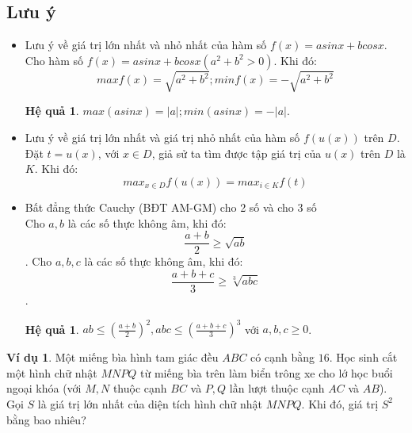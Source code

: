 \documentclass[12pt,a4paper,oneside]{book}
\theoremstyle{theorem}
\theoremstyle{definition}
\newtheorem{vd}[theorem2]{Ví dụ}
\newtheorem{hq}[theorem2]{Hệ quả}
\begin{document}
    \subsection{Lưu ý}
        \begin{itemize}
            \item[(i)] Lưu ý về giá trị lớn nhất và nhỏ nhất của hàm số $f(x)=asinx+bcosx$.\\
            Cho hàm số $f(x)=asinx+bcosx(a^2+b^2>0)$. Khi đó:
            $$maxf(x)= \sqrt{a^2+b^2};min f(x)=-\sqrt{a^2+b^2}$$
            \begin{hq}
                $max(asinx)= \lvert a \rvert; min(asinx)=-\lvert a \rvert$.
            \end{hq}
            \item[(ii)] Lưu ý về giá trị lớn nhất và giá trị nhỏ nhất của hàm số $f(u(x))$ trên $D$.\\
            Đặt $t=u(x)$, với $x \in D$, giả sử ta tìm được tập giá trị của $u(x)$ trên $D$ là $K$. Khi đó:
            $$max_{x\in D} f(u(x))= max_{i \in K} f(t)$$
            \item[(iii)] Bất đẳng thức Cauchy (BĐT AM-GM) cho 2 số và cho 3 số\\
            Cho $a,b$ là các số thực không âm, khi đó:
            $$\frac{a+b}{2} \geq \sqrt{ab}$$.
            Cho $a,b,c$ là các số thực không âm, khi đó:
            $$\frac{a+b+c}{3} \geq \sqrt[3]{abc}$$.
            \begin{hq}
                $ab \leq (\frac{a+b}{2})^2,abc \leq (\frac{a+b+c}{3})^3$ với $a,b,c \geq0$.
            \end{hq}
        \end{itemize}
        \begin{minipage}{0.68\textwidth}
        \begin{vd}
            Một miếng bìa hình tam giác đều $ABC$ có cạnh bằng $16$. Học sinh cắt một hình chữ nhật $MNPQ$ từ miếng bìa trên làm biển trông xe cho lớ học buổi ngoại khóa (với $M,N$ thuộc cạnh $BC$ và $P,Q$ lần lượt thuộc cạnh $AC$ và $AB$). Gọi $S$ là giá trị lớn nhất của diện tích hình chữ nhật $MNPQ$. Khi đó, giá trị $S^2$ bằng bao nhiêu?
        \end{vd}
        \end{minipage}
        \hfill
\end{document}
